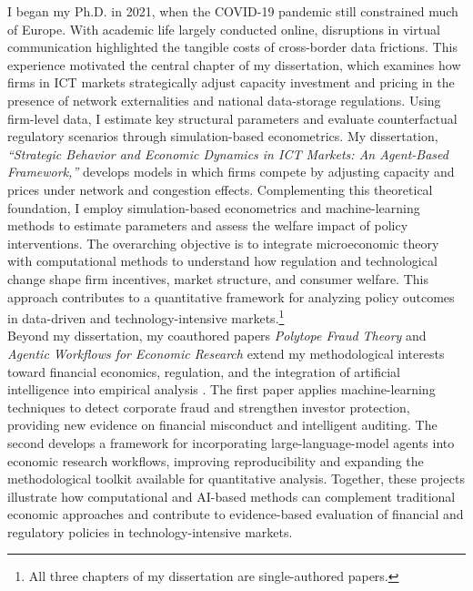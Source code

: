 \documentclass{nfr}
\begin{document}
I began my Ph.D. in 2021, when the COVID-19 pandemic still constrained much of Europe. 
With academic life largely conducted online, disruptions in virtual communication highlighted the tangible costs of cross-border data frictions. 
This experience motivated the central chapter of my dissertation, which examines how firms in ICT markets strategically adjust capacity investment and pricing in the presence of network externalities and national data-storage regulations. 
Using firm-level data, I estimate key structural parameters and evaluate counterfactual regulatory scenarios through simulation-based econometrics.
My dissertation, \textit{“Strategic Behavior and Economic Dynamics in ICT Markets: An Agent-Based Framework,”} develops models in which firms compete by adjusting capacity and prices under network and congestion effects. 
Complementing this theoretical foundation, I employ simulation-based econometrics and machine-learning methods to estimate parameters and assess the welfare impact of policy interventions. 
The overarching objective is to integrate microeconomic theory with computational methods to understand how regulation and technological change shape firm incentives, market structure, and consumer welfare. 
This approach contributes to a quantitative framework for analyzing policy outcomes in data-driven and technology-intensive markets.\footnote{All three chapters of my dissertation are single-authored papers.}\\

Beyond my dissertation, my coauthored papers \textit{Polytope Fraud Theory} and \textit{Agentic Workflows for Economic Research} extend my methodological interests toward financial economics, regulation, and the integration of artificial intelligence into empirical analysis \citep{Zhao2025, Dawid2025}. 
The first paper applies machine-learning techniques to detect corporate fraud and strengthen investor protection, providing new evidence on financial misconduct and intelligent auditing. 
The second develops a framework for incorporating large-language-model agents into economic research workflows, improving reproducibility and expanding the methodological toolkit available for quantitative analysis. 
Together, these projects illustrate how computational and AI-based methods can complement traditional economic approaches and contribute to evidence-based evaluation of financial and regulatory policies in technology-intensive markets.\\
\end{document}
